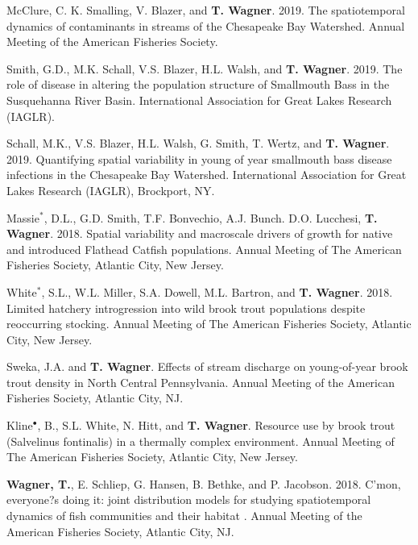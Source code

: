 \documentclass[10pt]{article}
\begin{document}
\begin{flushleft}
\begin{etaremune}
\item McClure, C. K. Smalling, V. Blazer, and \textbf{T. Wagner}. 2019. The spatiotemporal dynamics of contaminants in streams of the Chesapeake Bay Watershed. Annual Meeting of the American Fisheries Society.

\item Smith, G.D., M.K. Schall, V.S. Blazer, H.L. Walsh, and \textbf{T. Wagner}. 2019. The role of disease in altering the population structure of Smallmouth Bass in the Susquehanna River Basin. International Association for Great Lakes Research (IAGLR). 

\item Schall, M.K., V.S. Blazer, H.L. Walsh, G. Smith, T. Wertz, and \textbf{T. Wagner}. 2019. Quantifying spatial variability in young of year smallmouth bass disease infections in the Chesapeake Bay Watershed. International Association for Great Lakes Research (IAGLR), Brockport, NY.

\item Massie$^*$, D.L., G.D. Smith, T.F. Bonvechio, A.J. Bunch. D.O. Lucchesi, {\bf T. Wagner}. 2018. Spatial variability and macroscale drivers of growth for native and introduced Flathead Catfish populations. Annual Meeting of The American Fisheries Society, Atlantic City, New Jersey.

\item White$^*$, S.L., W.L. Miller, S.A. Dowell, M.L. Bartron, and {\bf T. Wagner}. 2018. Limited hatchery introgression into wild brook trout populations despite reoccurring stocking. Annual Meeting of The American Fisheries Society, Atlantic City, New Jersey.

\item Sweka, J.A. and {\bf T. Wagner}. Effects of stream discharge on young-of-year brook trout density in North Central Pennsylvania. Annual Meeting of the American Fisheries Society, Atlantic City, NJ.

\item Kline$^\bullet$, B., S.L. White, N. Hitt, and {\bf T. Wagner}. Resource use by brook trout (Salvelinus fontinalis) in a thermally complex environment. Annual Meeting of The American Fisheries Society, Atlantic City, New Jersey.

\item {\bf Wagner, T.}, E. Schliep, G. Hansen, B. Bethke, and P. Jacobson. 2018. C'mon, everyone?s doing it: joint distribution models for studying spatiotemporal dynamics of fish communities and their habitat . Annual Meeting of the American Fisheries Society, Atlantic City, NJ.


\end{etaremune}
\end{flushleft}
\end{document}
